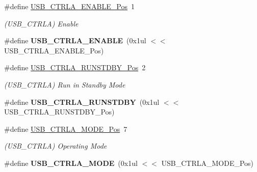 \begin{DoxyCompactItemize}
\item 
\hypertarget{group___s_a_m_l21___u_s_b_ga08727ee5c4d25daaba1d0ac058be6e21}{}\#define \hyperlink{group___s_a_m_l21___u_s_b_ga08727ee5c4d25daaba1d0ac058be6e21}{U\+S\+B\+\_\+\+C\+T\+R\+L\+A\+\_\+\+E\+N\+A\+B\+L\+E\+\_\+\+Pos}~1\label{group___s_a_m_l21___u_s_b_ga08727ee5c4d25daaba1d0ac058be6e21}

\begin{DoxyCompactList}\small\item\em (U\+S\+B\+\_\+\+C\+T\+R\+L\+A) Enable \end{DoxyCompactList}\item 
\hypertarget{group___s_a_m_l21___u_s_b_ga373468d22b9b8911a2af4e52f70adb01}{}\#define {\bfseries U\+S\+B\+\_\+\+C\+T\+R\+L\+A\+\_\+\+E\+N\+A\+B\+L\+E}~(0x1ul $<$$<$ U\+S\+B\+\_\+\+C\+T\+R\+L\+A\+\_\+\+E\+N\+A\+B\+L\+E\+\_\+\+Pos)\label{group___s_a_m_l21___u_s_b_ga373468d22b9b8911a2af4e52f70adb01}

\item 
\hypertarget{group___s_a_m_l21___u_s_b_ga2b12657c13e6fd8ac186e7fb163f1f53}{}\#define \hyperlink{group___s_a_m_l21___u_s_b_ga2b12657c13e6fd8ac186e7fb163f1f53}{U\+S\+B\+\_\+\+C\+T\+R\+L\+A\+\_\+\+R\+U\+N\+S\+T\+D\+B\+Y\+\_\+\+Pos}~2\label{group___s_a_m_l21___u_s_b_ga2b12657c13e6fd8ac186e7fb163f1f53}

\begin{DoxyCompactList}\small\item\em (U\+S\+B\+\_\+\+C\+T\+R\+L\+A) Run in Standby Mode \end{DoxyCompactList}\item 
\hypertarget{group___s_a_m_l21___u_s_b_ga8d6f688d7c5bdaae85b2db832ae8444b}{}\#define {\bfseries U\+S\+B\+\_\+\+C\+T\+R\+L\+A\+\_\+\+R\+U\+N\+S\+T\+D\+B\+Y}~(0x1ul $<$$<$ U\+S\+B\+\_\+\+C\+T\+R\+L\+A\+\_\+\+R\+U\+N\+S\+T\+D\+B\+Y\+\_\+\+Pos)\label{group___s_a_m_l21___u_s_b_ga8d6f688d7c5bdaae85b2db832ae8444b}

\item 
\hypertarget{group___s_a_m_l21___u_s_b_ga6261dc0af6c78b43e18d13ffeeccac0f}{}\#define \hyperlink{group___s_a_m_l21___u_s_b_ga6261dc0af6c78b43e18d13ffeeccac0f}{U\+S\+B\+\_\+\+C\+T\+R\+L\+A\+\_\+\+M\+O\+D\+E\+\_\+\+Pos}~7\label{group___s_a_m_l21___u_s_b_ga6261dc0af6c78b43e18d13ffeeccac0f}

\begin{DoxyCompactList}\small\item\em (U\+S\+B\+\_\+\+C\+T\+R\+L\+A) Operating Mode \end{DoxyCompactList}\item 
\hypertarget{group___s_a_m_l21___u_s_b_gafc72901c167d89fab62aba3679497247}{}\#define {\bfseries U\+S\+B\+\_\+\+C\+T\+R\+L\+A\+\_\+\+M\+O\+D\+E}~(0x1ul $<$$<$ U\+S\+B\+\_\+\+C\+T\+R\+L\+A\+\_\+\+M\+O\+D\+E\+\_\+\+Pos)\label{group___s_a_m_l21___u_s_b_gafc72901c167d89fab62aba3679497247}


\end{DoxyCompactItemize}
